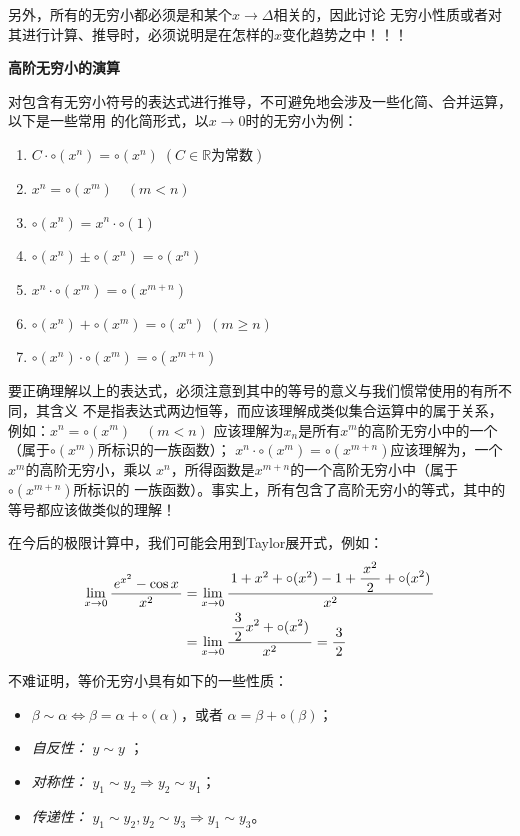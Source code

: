 另外，所有的无穷小都必须是和某个$x\to\Delta$相关的，因此讨论
无穷小性质或者对其进行计算、推导时，必须说明是在怎样的$x$变化趋势之中！！！

\begin{shaded}
	{\bf 高阶无穷小的演算}
	
	对包含有无穷小符号的表达式进行推导，不可避免地会涉及一些化简、合并运算，以下是一些常用
	的化简形式，以$x\to 0$时的无穷小为例：
	\begin{tcolorbox}
		\begin{enumerate}[(1)]
	  	  \item $C\cdot\circ(x^n)=\circ(x^n)\;(C\in\mathbb{R}\mbox{为常数})$
		  \item $x^n=\circ(x^m)\quad (m<n)$ 
		  \item $\circ(x^n)=x^n\cdot\circ(1)$
		  \item $\circ(x^n)\pm\circ(x^n)=\circ(x^n)$
		  \item $x^n\cdot\circ(x^m)=\circ(x^{m+n})$ 
		  \item $\circ(x^n)+\circ(x^m)=\circ(x^n)\;(m\geq n)$  
		  \item $\circ(x^n)\cdot\circ(x^m)=\circ(x^{m+n})$
		\end{enumerate}
	\end{tcolorbox}
	要正确理解以上的表达式，必须注意到其中的等号的意义与我们惯常使用的有所不同，其含义
	不是指表达式两边恒等，而应该理解成类似集合运算中的属于关系，例如：$x^n=\circ(x^m)\quad (m<n)$ 
	应该理解为$x_n$是所有$x^m$的高阶无穷小中的一个（属于$\circ(x^m)$所标识的一族函数）；
	$x^n\cdot\circ(x^m)=\circ(x^{m+n})$应该理解为，一个$x^m$的高阶无穷小，乘以
	$x^n$，所得函数是$x^{m+n}$的一个高阶无穷小中（属于$\circ(x^{m+n})$所标识的
	一族函数）。事实上，所有包含了高阶无穷小的等式，其中的等号都应该做类似的理解！
	
	在今后的极限计算中，我们可能会用到Taylor展开式，例如：
	\begin{align}
		\lim\limits_{x\to{0}}\displaystyle\frac{\,{e^{x^2}-\cos x}\,}{\,{x^2}\,}&=\lim\limits_{x\to{0}}
		\displaystyle\frac{\,{1+x^2+\circ(x^2)-1+\displaystyle\frac{\,{x^2}\,}{\,{2}\,}+\circ(x^2)}\,}{\,{x^2}\,}\notag\\
		&=\lim\limits_{x\to{0}}\displaystyle\frac{\,{\displaystyle\frac{\,{3}\,}{\,{2}\,}x^2+\circ(x^2)}\,}{\,{x^2}\,}=\displaystyle\frac{\,{3}\,}{\,{2}\,}\notag
	\end{align}
\end{shaded}


不难证明，等价无穷小具有如下的一些性质：
\begin{itemize}
  \setlength{\itemindent}{1cm}
  \item $\beta\sim\alpha\Leftrightarrow\beta=\alpha+\circ(\alpha)$，或者
	$\alpha=\beta+\circ(\beta)$；
  \item {\it 自反性：} $y\sim y$ ；
  \item {\it 对称性：} $y_1\sim y_2\Rightarrow y_2\sim y_1$； 
  \item {\it 传递性：} $y_1\sim y_2,y_2\sim y_3\Rightarrow y_1\sim y_3$。 
\end{itemize}

